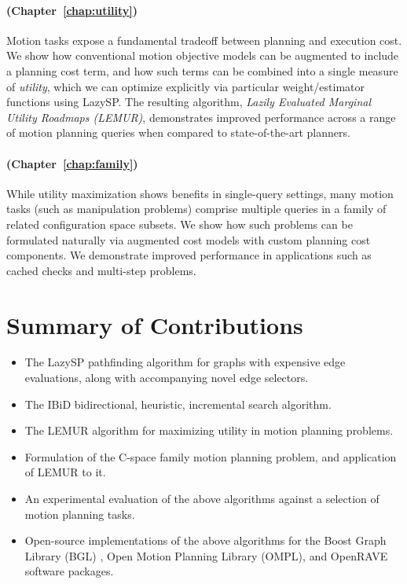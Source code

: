 \paragraph{ (Chapter~\ref{chap:utility})}
Motion tasks expose a fundamental tradeoff between planning and
execution cost.
We show how conventional motion objective models
can be augmented to include a planning cost term,
and how such terms can be combined into a single measure of
\emph{utility},
which we can optimize explicitly
via particular weight/estimator functions using LazySP.
The resulting algorithm,
\emph{Lazily Evaluated Marginal Utility Roadmaps (LEMUR)},
demonstrates improved performance across a range of motion planning
queries
when compared to state-of-the-art planners.

\paragraph{ (Chapter~\ref{chap:family})}
While utility maximization shows benefits in single-query settings,
many motion tasks (such as manipulation problems)
comprise multiple queries in a family of related configuration space
subsets.
We show how such problems can be formulated naturally via
augmented cost models with custom planning cost components.
We demonstrate improved performance in applications such as
cached checks and multi-step problems.


\section{Summary of Contributions}

\begin{itemize}
\item The LazySP pathfinding algorithm for graphs with expensive
   edge evaluations,
   along with accompanying novel edge selectors.
\item The IBiD bidirectional, heuristic, incremental search algorithm.
\item The LEMUR algorithm for maximizing utility
   in motion planning problems.
\item Formulation of the C-space family motion planning problem,
   and application of LEMUR to it.
\item An experimental evaluation of the above algorithms against a
   selection of motion planning tasks.
\item Open-source implementations of the above algorithms for the
   Boost Graph Library (BGL) \citep{siek2001boostgraph},
   Open Motion Planning Library (OMPL), \citep{sucan2012ompl}
   and OpenRAVE \citep{diankov2010openrave} software packages.
\end{itemize}


